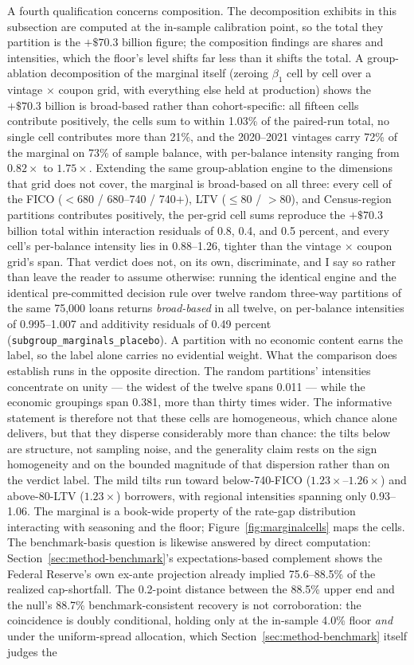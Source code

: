 \documentclass[12pt]{article}
\begin{document}
A fourth qualification concerns composition. The decomposition exhibits in this subsection are computed at the in-sample calibration point, so the total they partition is the $+\$70.3$ billion figure; the composition findings are shares and intensities, which the floor's level shifts far less than it shifts the total. A group-ablation decomposition of the marginal itself (zeroing $\beta_1$ cell by cell over a vintage $\times$ coupon grid, with everything else held at production) shows the $+\$70.3$ billion is broad-based rather than cohort-specific: all fifteen cells contribute positively, the cells sum to within 1.03\% of the paired-run total, no single cell contributes more than 21\%, and the 2020--2021 vintages carry 72\% of the marginal on 73\% of sample balance, with per-balance intensity ranging from $0.82\times$ to $1.75\times$. Extending the same group-ablation engine to the dimensions that grid does not cover, the marginal is broad-based on all three: every cell of the FICO ($<$680 / 680--740 / 740$+$), LTV ($\leq$80 / $>$80), and Census-region partitions contributes positively, the per-grid cell sums reproduce the $+\$70.3$ billion total within interaction residuals of 0.8, 0.4, and 0.5 percent, and every cell's per-balance intensity lies in 0.88--1.26, tighter than the vintage $\times$ coupon grid's span. That verdict does not, on its own, discriminate, and I say so rather than leave the reader to assume otherwise: running the identical engine and the identical pre-committed decision rule over twelve random three-way partitions of the same 75,000 loans returns \emph{broad-based} in all twelve, on per-balance intensities of 0.995--1.007 and additivity residuals of 0.49 percent (\texttt{subgroup\_marginals\_placebo}). A partition with no economic content earns the label, so the label alone carries no evidential weight. What the comparison does establish runs in the opposite direction. The random partitions' intensities concentrate on unity --- the widest of the twelve spans 0.011 --- while the economic groupings span 0.381, more than thirty times wider. The informative statement is therefore not that these cells are homogeneous, which chance alone delivers, but that they disperse considerably more than chance: the tilts below are structure, not sampling noise, and the generality claim rests on the sign homogeneity and on the bounded magnitude of that dispersion rather than on the verdict label. The mild tilts run toward below-740-FICO ($1.23\times$--$1.26\times$) and above-80-LTV ($1.23\times$) borrowers, with regional intensities spanning only 0.93--1.06. The marginal is a book-wide property of the rate-gap distribution interacting with seasoning and the floor; Figure~\ref{fig:marginalcells} maps the cells. The benchmark-basis question is likewise answered by direct computation: Section~\ref{sec:method-benchmark}'s expectations-based complement shows the Federal Reserve's own ex-ante projection already implied 75.6--88.5\% of the realized cap-shortfall. The 0.2-point distance between the 88.5\% upper end and the null's 88.7\% benchmark-consistent recovery is not corroboration: the coincidence is doubly conditional, holding only at the in-sample 4.0\% floor \emph{and} under the uniform-spread allocation, which Section~\ref{sec:method-benchmark} itself judges the 
\end{document}
